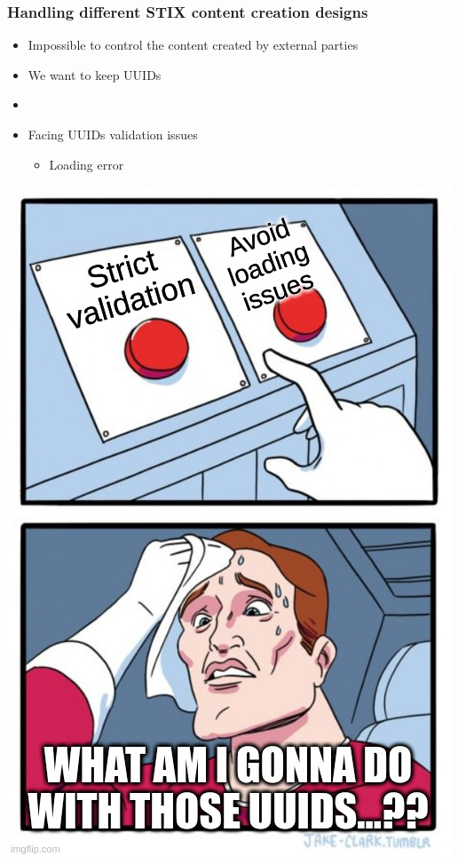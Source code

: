 \begin{frame}
    \frametitle{Handling different STIX content creation designs}
    \begin{minipage}{0.6\textwidth}
        \begin{itemize}
            \item Impossible to control the content created by external parties
            \item We want to keep UUIDs
            \pause
            \item []
            \item Facing UUIDs validation issues
            \begin{itemize}
                \item Loading error
            \end{itemize}
        \end{itemize}
    \end{minipage}%
    \begin{minipage}{0.4\textwidth}
        \includegraphics[scale=0.25]{images/two_buttons_dilemna.jpg}
    \end{minipage}
\end{frame}

